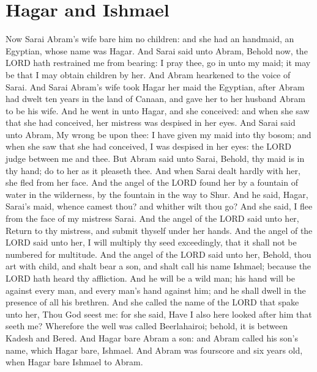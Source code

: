 \section*{Hagar and Ishmael}
\begin{biblechapter} %
\verse Now Sarai Abram's wife bare him no children: and she had an handmaid, an Egyptian, whose name was Hagar.
\verse And Sarai said unto Abram, Behold now, the LORD hath restrained me from bearing: I pray thee, go in unto my maid; it may be that I may obtain children by her. And Abram hearkened to the voice of Sarai.
\verse And Sarai Abram's wife took Hagar her maid the Egyptian, after Abram had dwelt ten years in the land of Canaan, and gave her to her husband Abram to be his wife.
\verse And he went in unto Hagar, and she conceived: and when she saw that she had conceived, her mistress was despised in her eyes.
\verse And Sarai said unto Abram, My wrong be upon thee: I have given my maid into thy bosom; and when she saw that she had conceived, I was despised in her eyes: the LORD judge between me and thee.
\verse But Abram said unto Sarai, Behold, thy maid is in thy hand; do to her as it pleaseth thee. And when Sarai dealt hardly with her, she fled from her face.
\verse And the angel of the LORD found her by a fountain of water in the wilderness, by the fountain in the way to Shur.
\verse And he said, Hagar, Sarai's maid, whence camest thou? and whither wilt thou go? And she said, I flee from the face of my mistress Sarai.
\verse And the angel of the LORD said unto her, Return to thy mistress, and submit thyself under her hands.
\verse And the angel of the LORD said unto her, I will multiply thy seed exceedingly, that it shall not be numbered for multitude.
\verse And the angel of the LORD said unto her, Behold, thou art with child, and shalt bear a son, and shalt call his name Ishmael; because the LORD hath heard thy affliction.
\verse And he will be a wild man; his hand will be against every man, and every man's hand against him; and he shall dwell in the presence of all his brethren.
\verse And she called the name of the LORD that spake unto her, Thou God seest me: for she said, Have I also here looked after him that seeth me?
\verse Wherefore the well was called Beerlahairoi; behold, it is between Kadesh and Bered.
\verse And Hagar bare Abram a son: and Abram called his son's name, which Hagar bare, Ishmael.
\verse And Abram was fourscore and six years old, when Hagar bare Ishmael to Abram.
\end{biblechapter}

